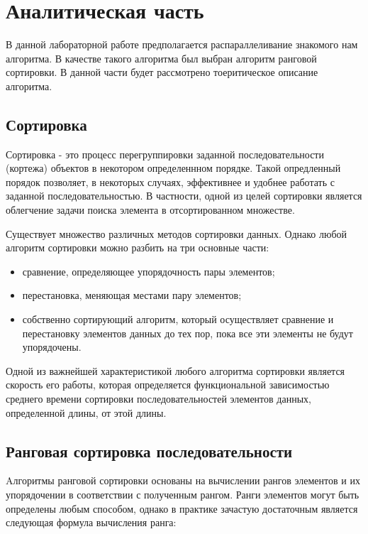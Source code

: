\chapter{Аналитическая часть}
В данной лабораторной работе предполагается распараллеливание знакомого нам алгоритма. В качестве такого алгоритма был выбран алгоритм ранговой сортировки. В данной части будет рассмотрено тоеритическое описание алгоритма.

\section{Сортировка}
Сортировка - это процесс перегруппировки заданной последовательности (кортежа) объектов в некотором определеннном порядке. Такой опредленный порядок позволяет, в некоторых случаях, эффективнее и удобнее
работать с заданной последовательностью. В частности, одной из целей
сортировки является облегчение задачи поиска элемента в отсортированном множестве.


Существует множество различных методов сортировки данных. Однако любой алгоритм сортировки можно разбить на три основные части:

\begin{itemize}
	\item сравнение, определяющее упорядочность пары элементов;
	\item перестановка, меняющая местами пару элементов;
	\item собственно сортирующий алгоритм, который осуществляет сравнение
	и перестановку элементов данных до тех пор, пока все эти элементы
	не будут упорядочены.
\end{itemize}

Одной из важнейшей характеристикой любого алгоритма сортировки является скорость его работы, которая определяется функциональной зависимостью среднего времени сортировки последовательностей элементов данных, определенной длины, от этой длины.


\section{Ранговая сортировка последовательности}

Aлгоритмы ранговой сортировки \cite{sortr} основаны на вычислении рангов элементов и их
упорядочении в соответствии с полученным рангом. Ранги элементов могут быть определены любым способом, однако в практике зачастую достаточным является следующая
формула вычисления ранга:
 
